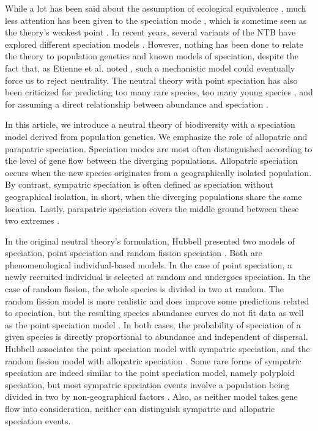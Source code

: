 \documentclass[letterpaper,twocolumn,superscriptaddress,showkeys]{revtex4}
\begin{document}
While a lot has been said about the assumption of ecological equivalence \cite{abr01b,pur10}, much less attention has been given to the speciation mode \cite{eti07}, which is sometime seen as the theory's weakest point \cite{kop10}. In recent years, several variants of the NTB have explored different speciation models \cite{eti07,hae09,ros10,dea09}. However, nothing has been done to relate the theory to population genetics and known models of speciation, despite the fact that, as Etienne et al. noted \cite{eti07}, such a mechanistic model could eventually force us to reject neutrality. The neutral theory with point speciation has also been criticized for predicting too many rare species, too many young species \cite{ric03}, and for assuming a direct relationship between abundance and speciation \cite{eti07}. 

In this article, we introduce a neutral theory of biodiversity with a speciation model derived from population genetics. We emphasize the role of allopatric and parapatric speciation. Speciation modes are most often distinguished according to the level of gene flow between the diverging populations. Allopatric speciation occurs when the new species originates from a geographically isolated population. By contrast, sympatric speciation is often defined as speciation without geographical isolation, in short, when the diverging populations share the same location. Lastly, parapatric speciation covers the middle ground between these two extremes \cite{gav03}.

In the original neutral theory's formulation, Hubbell presented two models of speciation, point speciation and random fission speciation \cite{hub01}. Both are phenomenological individual-based models. In the case of point speciation, a newly recruited individual is selected at random and undergoes speciation. In the case of random fission, the whole species is divided in two at random. The random fission model is more realistic and does improve some predictions related to speciation, but the resulting species abundance curves do not fit data as well as the point speciation model \cite{eti11}. In both cases, the probability of speciation of a given species is directly proportional to abundance and independent of dispersal. Hubbell associates the point speciation model with sympatric speciation, and the random fission model with allopatric speciation \cite{hub01}. Some rare forms of sympatric speciation are indeed similar to the point speciation model, namely polyploid speciation, but most sympatric speciation events involve a population being divided in two by non-geographical factors \cite{coy04}. Also, as neither model takes gene flow into consideration, neither can distinguish sympatric and allopatric speciation events.
\end{document}
